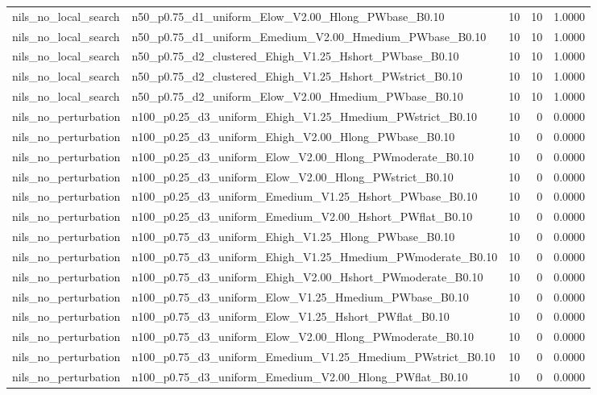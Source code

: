 \begin{tabular}{llrrr}
nils_no_local_search & n50_p0.75_d1_uniform_Elow_V2.00_Hlong_PWbase_B0.10 & 10 & 10 & 1.0000 \\
nils_no_local_search & n50_p0.75_d1_uniform_Emedium_V2.00_Hmedium_PWbase_B0.10 & 10 & 10 & 1.0000 \\
nils_no_local_search & n50_p0.75_d2_clustered_Ehigh_V1.25_Hshort_PWbase_B0.10 & 10 & 10 & 1.0000 \\
nils_no_local_search & n50_p0.75_d2_clustered_Ehigh_V1.25_Hshort_PWstrict_B0.10 & 10 & 10 & 1.0000 \\
nils_no_local_search & n50_p0.75_d2_uniform_Elow_V2.00_Hmedium_PWbase_B0.10 & 10 & 10 & 1.0000 \\
nils_no_perturbation & n100_p0.25_d3_uniform_Ehigh_V1.25_Hmedium_PWstrict_B0.10 & 10 & 0 & 0.0000 \\
nils_no_perturbation & n100_p0.25_d3_uniform_Ehigh_V2.00_Hlong_PWbase_B0.10 & 10 & 0 & 0.0000 \\
nils_no_perturbation & n100_p0.25_d3_uniform_Elow_V2.00_Hlong_PWmoderate_B0.10 & 10 & 0 & 0.0000 \\
nils_no_perturbation & n100_p0.25_d3_uniform_Elow_V2.00_Hlong_PWstrict_B0.10 & 10 & 0 & 0.0000 \\
nils_no_perturbation & n100_p0.25_d3_uniform_Emedium_V1.25_Hshort_PWbase_B0.10 & 10 & 0 & 0.0000 \\
nils_no_perturbation & n100_p0.25_d3_uniform_Emedium_V2.00_Hshort_PWflat_B0.10 & 10 & 0 & 0.0000 \\
nils_no_perturbation & n100_p0.75_d3_uniform_Ehigh_V1.25_Hlong_PWbase_B0.10 & 10 & 0 & 0.0000 \\
nils_no_perturbation & n100_p0.75_d3_uniform_Ehigh_V1.25_Hmedium_PWmoderate_B0.10 & 10 & 0 & 0.0000 \\
nils_no_perturbation & n100_p0.75_d3_uniform_Ehigh_V2.00_Hshort_PWmoderate_B0.10 & 10 & 0 & 0.0000 \\
nils_no_perturbation & n100_p0.75_d3_uniform_Elow_V1.25_Hmedium_PWbase_B0.10 & 10 & 0 & 0.0000 \\
nils_no_perturbation & n100_p0.75_d3_uniform_Elow_V1.25_Hshort_PWflat_B0.10 & 10 & 0 & 0.0000 \\
nils_no_perturbation & n100_p0.75_d3_uniform_Elow_V2.00_Hlong_PWmoderate_B0.10 & 10 & 0 & 0.0000 \\
nils_no_perturbation & n100_p0.75_d3_uniform_Emedium_V1.25_Hmedium_PWstrict_B0.10 & 10 & 0 & 0.0000 \\
nils_no_perturbation & n100_p0.75_d3_uniform_Emedium_V2.00_Hlong_PWflat_B0.10 & 10 & 0 & 0.0000 \\

\end{tabular}
